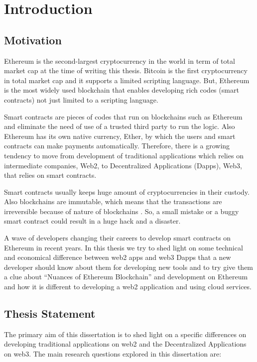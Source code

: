 \chapter{Introduction}


\section{Motivation}
Ethereum is the second-largest cryptocurrency in the world in term of total market cap at the time of writing this thesis. Bitcoin is the first cryptocurrency in total market cap and it supports a limited scripting language. But, Ethereum is the most widely used blockchain that enables developing rich codes (smart contracts) not just limited to a scripting language.

Smart contracts are pieces of codes that run on blockchains such as Ethereum and eliminate the need of use of a trusted third party to run the logic. Also Ethereum has its own native currency, Ether, by which the users and smart contracts can make payments automatically.
Therefore, there is a growing tendency to move from development of traditional applications which relies on intermediate companies, Web2, to Decentralized Applications (Dapps), Web3, that relies on smart contracts. 

Smart contracts usually keeps huge amount of cryptocurrencies in their custody. Also blockchains are immutable, which means that the transactions are irreversible because of nature of blockchains . So, a small mistake or a buggy smart contract could result in a huge hack and a disaster.


A wave of developers changing their careers to develop smart contracts on Ethereum in recent years. In this thesis we try to shed light on some technical and economical difference between web2 apps and web3 Dapps that a new developer should know about them for developing new tools and to try give them a clue about ``Nuances of Ethereum Blockchain'' and development on Ethereum and how it is different to developing a web2 application and using cloud services.  


\section{Thesis Statement}
The primary aim of this dissertation is to shed light on a specific differences on developing traditional applications on web2 and the Decentralized Applications on web3. The main research questions explored in this dissertation are:

